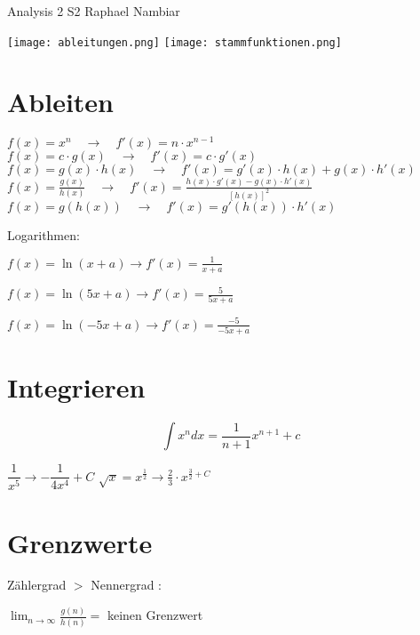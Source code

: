 



\begin{multicols*}{3}

    \DocumentInfo
    {Analysis 2 S2} %
    {Raphael Nambiar} %





    \texttt{[image: ableitungen.png]}
    \texttt{[image: stammfunktionen.png]}

    \section{ Ableiten }

    $f(x) = x^n \quad \rightarrow \quad f'(x) = n \cdot x^{n-1}$
    \WhiteSpace
    $f(x) = c \cdot g(x) \quad \rightarrow \quad f'(x) = c \cdot g'(x)$
    \WhiteSpace
    $f(x) = g(x) \cdot h(x) \quad \rightarrow \quad f'(x) = g'(x) \cdot h(x) + g(x) \cdot h'(x)$
    \WhiteSpace
    $f(x) = \frac{g(x)}{h(x)} \quad \rightarrow \quad f'(x)=\frac{h(x) \cdot g'(x) - g(x) \cdot h'(x)}{\left[h(x)\right]^2}$
    \WhiteSpace
    $f(x) = g(h(x)) \quad \rightarrow \quad f'(x) = g'(h(x)) \cdot h'(x)$
    \WhiteSpace

    {Logarithmen:}

    {$f(x) = \ln(x+a) \to f'(x) = \frac{1}{x+a}$}

    {$f(x) = \ln(5x+a) \to f'(x) = \frac{5}{5x+a}$}

    {$f(x) = \ln(-5x+a) \to f'(x) = \frac{-5}{-5x+a}$}
    \WhiteSpace
    \section{ Integrieren }
    \WhiteSpace
    {$$\int x^n dx = \frac{1}{n+1}x^{n+1}+c$$}

    \WhiteSpace
    {$\dfrac{1}{x^5} \rightarrow -\dfrac{1}{4x^4} + C$}
    \WhiteSpace
    \WhiteSpace
    {$\sqrt{x} = x^{\frac{1}{2}} \rightarrow \frac{2}{3}\cdot x^{\frac{3}{2} + C} $}
    \WhiteSpace
    \WhiteSpace
    \vfill\null
    \columnbreak
    \section{Grenzwerte}
    \WhiteSpace
    {Zählergrad $>$ Nennergrad : }

    {\large $ \lim_{n\to \infty} \frac{g(n)}{h(n)} = $ keinen Grenzwert}
    \WhiteSpace


\end{multicols*}
